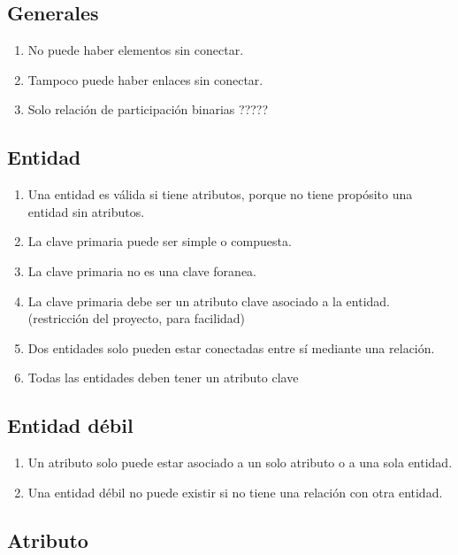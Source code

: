 \subsection{Generales}
\begin{enumerate}
    \item No puede haber elementos sin conectar.
    \item Tampoco puede haber enlaces sin conectar.
    \item Solo relación de participación binarias ?????
\end{enumerate}



\subsection{Entidad}
\begin{enumerate}
    \item Una entidad es válida si tiene atributos, porque no tiene propósito una entidad sin atributos.
    \item La clave primaria puede ser simple o compuesta.
    \item La clave primaria no es una clave foranea.
    \item La clave primaria debe ser un atributo clave asociado a la entidad. (restricción del proyecto, para facilidad)
    \item Dos entidades solo pueden estar conectadas entre sí mediante una relación.
    \item Todas las entidades deben tener un atributo clave
\end{enumerate}

\subsection{Entidad débil}
\begin{enumerate}
    \item Un atributo solo puede estar asociado a un solo atributo o a una sola entidad.
    \item Una entidad débil no puede existir si no tiene una relación con otra entidad.
\end{enumerate}

\subsection{Atributo}

